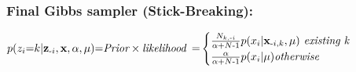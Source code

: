 \subsubsection{Final Gibbs sampler (Stick-Breaking):}
$	p(z_i\text{=}k|\mathbf z_{\text{-}i},\mathbf x,\alpha,\mu) \text{=} \textit{Prior} \times \textit{likelihood}$ $
	\text{=} \begin{cases}
			\frac{N_{k, \text{-}i}}{\alpha \text{+} N \text{-} 1} p(x_i| \mathbf x_{\text{-}i, k}, \mu)	 \textit{ existing k} \\
			\frac{\alpha}{\alpha \text{+} N \text{-} 1} p(x_i|\mu) \textit{otherwise} 
		\end{cases}
$

%
%
%
%
%
%
%
